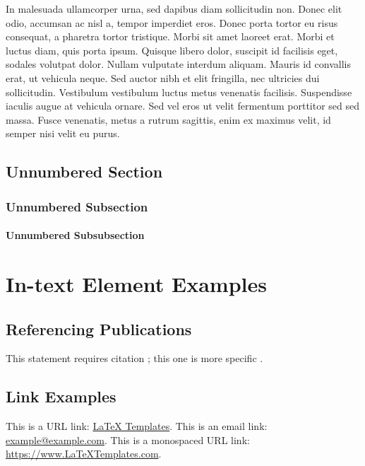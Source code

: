 \documentclass[
	11pt,
	fleqn,
	a4paper,
]{LegrandOrangeBook}
\begin{document}
In malesuada ullamcorper urna, sed dapibus diam sollicitudin non. Donec elit odio, accumsan ac nisl a, tempor imperdiet eros. Donec porta tortor eu risus consequat, a pharetra tortor tristique. Morbi sit amet laoreet erat. Morbi et luctus diam, quis porta ipsum. Quisque libero dolor, suscipit id facilisis eget, sodales volutpat dolor. Nullam vulputate interdum aliquam. Mauris id convallis erat, ut vehicula neque. Sed auctor nibh et elit fringilla, nec ultricies dui sollicitudin. Vestibulum vestibulum luctus metus venenatis facilisis. Suspendisse iaculis augue at vehicula ornare. Sed vel eros ut velit fermentum porttitor sed sed massa. Fusce venenatis, metus a rutrum sagittis, enim ex maximus velit, id semper nisi velit eu purus.


\section*{Unnumbered Section}

\subsection*{Unnumbered Subsection}

\subsubsection*{Unnumbered Subsubsection}



\chapter{In-text Element Examples}

\section{Referencing Publications}

This statement requires citation \cite{Smith:2022jd}; this one is more specific \cite[162]{Smith:2021qr}.


\section{Link Examples}

This is a URL link: \href{https://www.latextemplates.com}{LaTeX Templates}. This is an email link: \href{mailto:example@example.com}{example@example.com}. This is a monospaced URL link: \url{https://www.LaTeXTemplates.com}.
\end{document}
